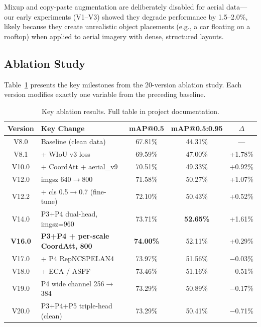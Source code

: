\documentclass[11pt]{article}
\begin{document}
Mixup and copy-paste augmentation are deliberately disabled for aerial data—our early experiments
(V1--V3) showed they degrade performance by 1.5--2.0\%, likely because they create unrealistic
object placements (e.g., a car floating on a rooftop) when applied to aerial imagery with dense,
structured layouts.

\subsection{Ablation Study}

Table~\ref{tab:ablation} presents the key milestones from the 20-version ablation study. Each
version modifies exactly one variable from the preceding baseline.

\begin{table}[H]
\centering
\caption{Key ablation results. Full table in project documentation.}
\label{tab:ablation}
\begin{tabular}{clccc}
\toprule
Version & Key Change & mAP@0.5 & mAP@0.5:0.95 & $\Delta$ \\
\midrule
V8.0  & Baseline (clean data) & 67.81\% & 44.31\% & --- \\
V8.1  & + WIoU v3 loss & 69.59\% & 47.00\% & +1.78\% \\
V10.0 & + CoordAtt + aerial\_v9\footnotemark[3] & 70.51\% & 49.33\% & +0.92\% \\
V12.0 & imgsz 640$\rightarrow$800\footnotemark[1] & 71.58\% & 50.27\% & +1.07\% \\
V12.2 & + cls 0.5$\rightarrow$0.7 (fine-tune) & 72.10\% & 50.43\% & +0.52\% \\
V14.0 & P3+P4 dual-head, imgsz=960\footnotemark[2] & 73.71\% & \textbf{52.65\%} & +1.61\% \\
\textbf{V16.0} & \textbf{P3+P4 + per-scale CoordAtt, 800} & \textbf{74.00\%} & 52.11\% & +0.29\% \\
V17.0 & + P4 RepNCSPELAN4 & 73.97\% & 51.56\% & $-$0.03\% \\
V18.0 & + ECA / ASFF & 73.46\% & 51.16\% & $-$0.51\% \\
V19.0 & P4 wide channel 256$\rightarrow$384 & 73.29\% & 50.89\% & $-$0.17\% \\
V20.0 & P3+P4+P5 triple-head (clean) & 73.29\% & 50.41\% & $-$0.71\% \\
\bottomrule
\end{tabular}
\end{table}

\end{document}
